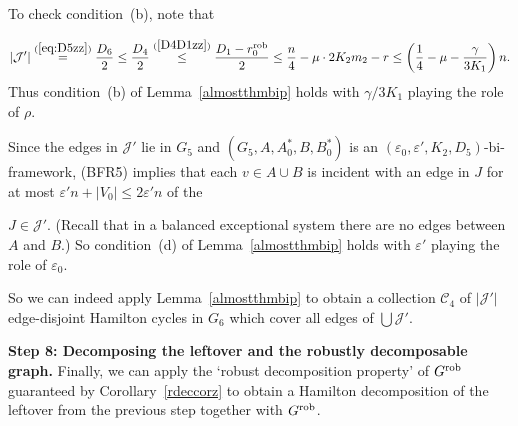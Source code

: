 \documentclass{memo-l}
\def\COMMENT#1{}
\def\cC{\mathcal{C}}
\def\eps{\varepsilon}
\def\cJ{\mathcal{J}}
\numberwithin{section}{chapter}
\numberwithin{equation}{section}
\numberwithin{firstthm}{section}
\numberwithin{figure}{section}
\begin{document}
{To check condition~(b), note that%
   \COMMENT{Daniela added $\frac{D_4}{2}$ to the display below}
$$|\cJ'|\stackrel{(\ref{eq:D5zz})}{=}  \frac{D_6}{2}\le  \frac{D_4}{2}
\stackrel{(\ref{D4D1zz})}{\le}  \frac{D_1-r^{\rm rob}_0}{2}\le \frac{n}{4}-\mu \cdot 2K_2m_2-r\le
\left(\frac{1}{4}-\mu-\frac{\gamma}{3 K_1}\right)n.$$
Thus condition~(b) of Lemma~\ref{almostthmbip} holds with $\gamma/3 K_1$ playing the role of $\rho$.

Since the edges in $\cJ'$ lie in $G_5$ and  $(G_5,A,A^*_0,B,B^*_0)$ is an $(\eps_0,\eps',K_2,D_5)$-bi-framework,
(BFR5) implies that each $v \in A \cup B$ is incident with an edge in $J$ for at most $\eps ' n+|V_0|\leq 2\eps 'n$ of the%
\COMMENT{osthus added `of the} 
$J \in \cJ '$. 
(Recall that in a balanced exceptional system there are no edges between $A$ and $B$.)
So condition~(d) of Lemma~\ref{almostthmbip} holds with $\eps '$ playing the role of $\eps _0$.

So we can indeed apply Lemma~\ref{almostthmbip} to obtain a collection $\cC_4$ of $|\cJ'|$ edge-disjoint Hamilton cycles in $G_6$
which cover all edges of $\bigcup \cJ'$.

\smallskip

\noindent\textbf{Step 8: Decomposing the leftover and the robustly decomposable graph.}
Finally, we can apply the `robust decomposition property' of $G^{\rm rob}$ guaranteed by Corollary~\ref{rdeccorz}
to obtain a Hamilton decomposition of the leftover from the previous step together with $G^{\rm rob}$.
 
}
\end{document}
